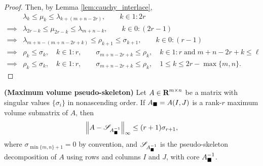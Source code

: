 \documentclass{article}
\begin{document}
\begin{proof}
		Then, by Lemma \ref{lem:cauchy_interlace},
		\begin{align}
			&\lambda_k \le \mu_k \le \lambda_{k+(m+n-2r)}, \qquad k \in 1:2r \\
			\implies&\lambda_{2r-k} \le \mu_{2r-k} \le \lambda_{m+n-k}, \qquad k \in 0:(2r-1) \\
			\implies&\lambda_{m+n -(m+n-2r+k)} \le \rho_{k+1} \le \sigma_{k+1}, \qquad k \in 0:(r-1) \\
			\implies&\rho_k \le \sigma_k, \quad k \in 1:r, \qquad \sigma_{m+n -2r+k} \le \rho_k, \quad k\in 1:r\;\text{and}\;m+n-2r+k \le \ell \\
			\implies&\rho_k \le \sigma_k, \quad k \in 1:r, \qquad \sigma_{m+n -2r+k} \le \rho_k, \quad 1\le k \le 2r-\max\{m,n\}.
		\end{align}
	\end{proof}
	
	\begin{thm} \textnormal{\bf(Maximum volume pseudo-skeleton)}
		\label{thm:maxvol_pseudo-skeleton}
		Let $A \in \textnormal{\bf R}^{m\times n}$ be a matrix with singular values $\{\sigma_i\}$ in nonascending order. If $A_\blacksquare = A(I,J)$ is a rank-$r$ maximum volume submatrix of $A$, then
		\begin{equation}
			\left\lVert A - \mathscr{S}_{A_\blacksquare^{-1}} \right\rVert_\infty \le (r+1)\sigma_{r+1},
		\end{equation}
		where $\sigma_{\min\{m,n\}+1} = 0$ by convention, and $\mathscr{S}_{A_\blacksquare^{-1}}$ is the pseudo-skeleton decomposition of $A$ using rows and columns $I$ and $J$, with core $A_\blacksquare^{-1}$.
	\end{thm}
	
\end{document}
